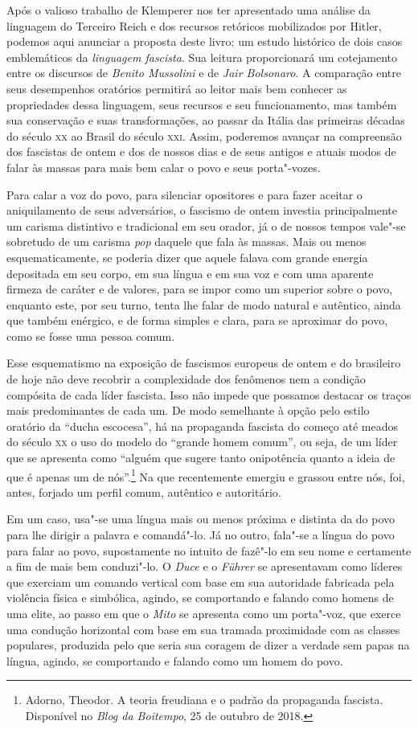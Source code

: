 Após o valioso trabalho de Klemperer nos ter apresentado uma análise da
linguagem do Terceiro Reich e dos recursos retóricos mobilizados por
Hitler, podemos aqui anunciar a proposta deste livro: um estudo
histórico de dois casos emblemáticos da \emph{linguagem
fascista}. Sua leitura proporcionará um cotejamento entre os discursos
de \emph{Benito Mussolini} e de \emph{Jair Bolsonaro}.
A comparação entre seus desempenhos oratórios permitirá ao leitor mais
bem conhecer as propriedades dessa linguagem, seus recursos e seu
funcionamento, mas também sua conservação e suas transformações, ao
passar da Itália das primeiras décadas do século \textsc{xx} ao Brasil do século
\textsc{xxi}. Assim, poderemos avançar na compreensão dos fascistas de ontem e
dos de nossos dias e de seus antigos e atuais modos de falar às massas
para mais bem calar o povo e seus porta"-vozes.

Para calar a voz do povo, para silenciar opositores e para fazer aceitar
o aniquilamento de seus adversários, o fascismo de ontem investia
principalmente um carisma distintivo e tradicional em seu orador, já o
de nossos tempos vale"-se sobretudo de um carisma \emph{pop} daquele que
fala às massas. Mais ou menos esquematicamente, se poderia dizer que
aquele falava com grande energia depositada em seu corpo, em sua língua
e em sua voz e com uma aparente firmeza de caráter e de valores, para se
impor como um superior sobre o povo, enquanto este, por seu turno, tenta
lhe falar de modo natural e autêntico, ainda que também enérgico, e de
forma simples e clara, para se aproximar do povo, como se fosse uma
pessoa comum.

Esse esquematismo na exposição de fascismos europeus de ontem e do
brasileiro de hoje não deve recobrir a complexidade dos fenômenos nem a
condição compósita de cada líder fascista. Isso não impede que possamos
destacar os traços mais predominantes de cada um. De modo semelhante à
opção pelo estilo oratório da ``ducha escocesa'', há na propaganda
fascista do começo até meados do século \textsc{xx} o uso do modelo do ``grande
homem comum'', ou seja, de um líder que se apresenta como ``alguém que
sugere tanto onipotência quanto a ideia de que é apenas um de
nós''.\footnote{Adorno, Theodor. A teoria freudiana e o padrão da
  propaganda fascista. Disponível no \textit{Blog da Boitempo}, 25 de outubro de 2018.}
Na que recentemente emergiu e grassou entre nós, foi, antes, forjado um
perfil comum, autêntico e autoritário.

Em um caso, usa"-se uma língua mais ou menos próxima e distinta da do
povo para lhe dirigir a palavra e comandá"-lo. Já no outro, fala"-se a
língua do povo para falar ao povo, supostamente no intuito de fazê"-lo em
seu nome e certamente a fim de mais bem conduzi"-lo. O \emph{Duce} e o
\emph{Führer} se apresentavam como líderes que exerciam um comando
vertical com base em sua autoridade fabricada pela violência física e
simbólica, agindo, se comportando e falando como homens de uma elite, ao
passo em que o \emph{Mito} se apresenta como um porta"-voz, que exerce
uma condução horizontal com base em sua tramada proximidade com as
classes populares, produzida pelo que seria sua coragem de dizer a
verdade sem papas na língua, agindo, se comportando e falando como um
homem do povo.

